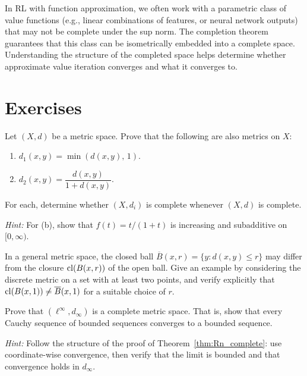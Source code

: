 \documentclass[11pt,a4paper]{article}
\begin{document}
\begin{rlconnection}[title={Completion and Function Approximation}]
In RL with function approximation, we often work with a parametric class of
value functions (e.g., linear combinations of features, or neural network
outputs) that may not be complete under the sup norm. The completion theorem
guarantees that this class can be isometrically embedded into a complete space.
Understanding the structure of the completed space helps determine whether
approximate value iteration converges and what it converges to.
\end{rlconnection}


\section{Exercises}
\label{sec:exercises}

\begin{exercise}
\label{ex:derived_metrics}
Let $(X,d)$ be a metric space. Prove that the following are also metrics on $X$:
\begin{enumerate}[nosep,label=(\alph*)]
  \item $d_1(x,y) = \min(d(x,y),\, 1)$.
  \item $d_2(x,y) = \dfrac{d(x,y)}{1 + d(x,y)}$.
\end{enumerate}
For each, determine whether $(X,d_i)$ is complete whenever $(X,d)$ is
complete.

\emph{Hint:} For (b), show that $f(t) = t/(1+t)$ is increasing and
subadditive on $[0,\infty)$.
\end{exercise}

\begin{exercise}
\label{ex:closed_ball}
In a general metric space, the closed ball
$\overline{B}(x,r) = \{y : d(x,y) \le r\}$ may differ from the closure
$\operatorname{cl}(B(x,r))$ of the open ball. Give an example by considering the discrete
metric on a set with at least two points, and verify explicitly that
$\operatorname{cl}(B(x,1)) \ne \overline{B}(x,1)$ for a suitable choice of $r$.
\end{exercise}

\begin{exercise}
\label{ex:ell_inf_complete}
Prove that $(\ell^\infty, d_\infty)$ is a complete metric space. That is,
show that every Cauchy sequence of bounded sequences converges to a bounded
sequence.

\emph{Hint:} Follow the structure of the proof of
Theorem~\ref{thm:Rn_complete}: use coordinate-wise convergence, then verify
that the limit is bounded and that convergence holds in $d_\infty$.
\end{exercise}
\end{document}
